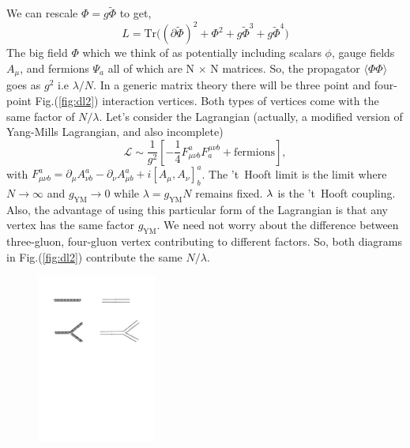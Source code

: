 We can rescale $ \Phi = g \tilde{\Phi}$  to get, 
\begin{equation}
L = \mathrm{Tr} \Bigg( (\partial \tilde{\Phi})^2 + \Phi^2 + g \tilde{\Phi}^3 + g \tilde{\Phi}^4  \Bigg)
\end{equation} 
The big field $\Phi$ which we think of as potentially including scalars $\phi$, gauge fields $A_{\mu}$, and fermions $\Psi_{a}$  all of which are N $\times$ N matrices.
So, the propagator $\langle \Phi \Phi \rangle$ goes as $g^2$ i.e $\lambda/N$. In a generic matrix theory there will be three point and four-point Fig.(\ref{fig:dl2}) interaction
vertices. Both types of vertices come with the same factor of $N/\lambda$. Let's consider the 
Lagrangian (actually, a modified version of Yang-Mills Lagrangian, and also incomplete)
\begin{equation}
\label{eq:action1}
\mathscr{L} \sim  \frac{1}{g^2} \left [ -\frac{1}{4} F_{\mu\nu b}^{a}F^{\mu\nu b}_{a} + \text{fermions} \right]  ,
\end{equation}
with $F_{\mu\nu b}^{a} = \partial_{\mu} A^{a}_{\nu b} - \partial_{\nu} A^{a}_{\mu b} + i [A_{\mu}, A_{\nu}]^{a}_{b}$. 
The 't~Hooft limit is the limit where $N \to \infty$ and $g_{\text{YM}} \to 0$ while $\lambda = g_{\text{YM}} N $ remains fixed. $\lambda$ is the 
't~Hooft coupling. Also, the advantage of using this particular form of the Lagrangian is that any vertex 
has the same factor $g_{\text{YM}}$. 
We need not worry about the difference between three-gluon, four-gluon vertex contributing 
to different factors. So, both diagrams in Fig.(\ref{fig:dl2}) contribute the same $N/\lambda$. 

\begin{figure}
\begin{center}\includegraphics[width=0.35\textwidth]{./Figures/DL1}\end{center}
\end{figure}

